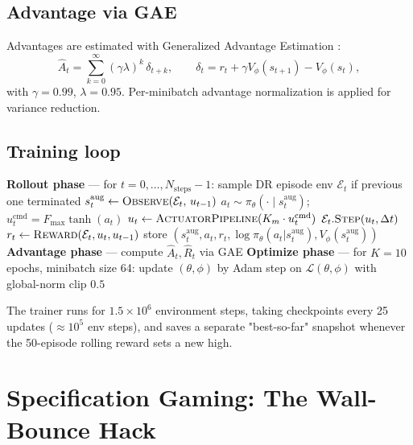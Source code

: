 \documentclass[11pt,a4paper]{article}
\begin{document}
\subsection{Advantage via GAE}
Advantages are estimated with Generalized Advantage Estimation \cite{schulman2015gae}:
\begin{equation}
\hat A_t = \sum_{k=0}^{\infty} (\gamma\lambda)^k\,\delta_{t+k},
\qquad
\delta_t = r_t + \gamma V_\phi(s_{t+1}) - V_\phi(s_t),
\end{equation}
with $\gamma = 0.99$, $\lambda = 0.95$. Per-minibatch advantage normalization is applied for variance reduction.

\subsection{Training loop}
\begin{algorithm}[h]
\caption{PI-PPO-DR training (one update)}
\begin{algorithmic}[1]
\State \textbf{Rollout phase} --- for $t=0,\dots,N_{\text{steps}}-1$:
\State \quad sample DR episode env $\mathcal{E}_t$ if previous one terminated
\State \quad $s^{\text{aug}}_t \gets \textsc{Observe}(\mathcal{E}_t,\,u_{t-1})$
\State \quad $a_t \sim \pi_\theta(\cdot \mid s^{\text{aug}}_t)$;\; $u^{\text{cmd}}_t = F_{\max}\tanh(a_t)$
\State \quad $u_t \gets \textsc{ActuatorPipeline}(K_m \cdot u^{\text{cmd}}_t)$ 
\State \quad $\mathcal{E}_t.\textsc{Step}(u_t,\Delta t)$ 
\State \quad $r_t \gets \textsc{Reward}(\mathcal{E}_t, u_t, u_{t-1})$ 
\State \quad store $(s^{\text{aug}}_t, a_t, r_t, \log\pi_\theta(a_t|s^{\text{aug}}_t), V_\phi(s^{\text{aug}}_t))$
\State \textbf{Advantage phase} --- compute $\hat A_t,\hat R_t$ via GAE
\State \textbf{Optimize phase} --- for $K=10$ epochs, minibatch size 64:
\State \quad update $(\theta,\phi)$ by Adam step on $\mathcal{L}(\theta,\phi)$ with global-norm clip $0.5$
\end{algorithmic}
\end{algorithm}

\noindent The trainer runs for $1.5\!\times\!10^6$ environment steps, taking checkpoints every 25 updates ($\approx 10^5$ env steps), and saves a separate "best-so-far" snapshot whenever the 50-episode rolling reward sets a new high.

\section{Specification Gaming: The Wall-Bounce Hack}
\label{sec:wallhack}
\end{document}
